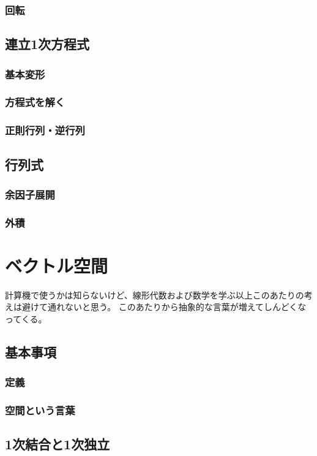 \documentclass[10pt]{jsarticle}
\theoremstyle{definition}%
\numberwithin{equation}{section}%
\begin{document}
\subsubsection{回転}
\subsection{連立1次方程式}

\subsubsection{基本変形}
\subsubsection{方程式を解く}
\subsubsection{正則行列・逆行列}
\subsection{行列式}
\subsubsection{余因子展開}
\subsubsection{外積}

\section{ベクトル空間}
計算機で使うかは知らないけど、線形代数および数学を学ぶ以上このあたりの考えは避けて通れないと思う。
このあたりから抽象的な言葉が増えてしんどくなってくる。
\subsection{基本事項}
\subsubsection{定義}
\subsubsection{空間という言葉}
\subsection{1次結合と1次独立}
\end{document}
